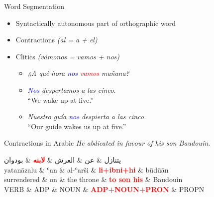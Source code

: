 \documentclass[10pt, compress, aspectratio=169]{beamer}
\renewcommand{\alert}[1]{\textcolor{red}{\textbf{#1}}}
\newcommand{\ar}[1]{{\arfont #1}}
\begin{document}
\begin{frame}{Word Segmentation}
\begin{itemize}
\begin{itemize}
  \item Syntactically autonomous part of orthographic word
  \item Contractions \textit{(al = a + el)}
  \item Clitics \textit{(vámonos = vamos + nos)}
    \begin{itemize}
    \item \textit{¿A qué hora \textcolor{blue}{nos} \textcolor{red}{vamos} mañana?}
    \item \textit{\textcolor{blue}{Nos} despertamos a las cinco.}\\``We wake up at five.''
    \item \textit{Nuestro guía \textcolor{blue}{nos} despierta a las cinco.}\\``Our guide wakes us up at five.''
    \end{itemize}
  \end{itemize}
\end{itemize}
\end{frame}



\begin{frame}{Contractions in Arabic}
\textit{He abdicated in favour of his son Baudouin.}

\begin{dependency}[label style={thick, font=\bfseries}]
\begin{deptext}[font=\bfseries]
\ar{يتنازل} \& \ar{عن} \& \ar{العرش} \& \alert{\ar{لابنه}} \& \ar{بودوان}
\\[0.1cm]
yatanāzalu \& ʿan \& al-ʿarši \& \alert{li+ibni+hi} \& būdūān \\
surrendered \& on \& the throne \& \alert{to son his} \& Baudouin \\
VERB \& ADP \& NOUN \& \alert{ADP+NOUN+PRON} \& PROPN \\
\end{deptext}
\end{dependency}
\end{frame}
\end{document}
